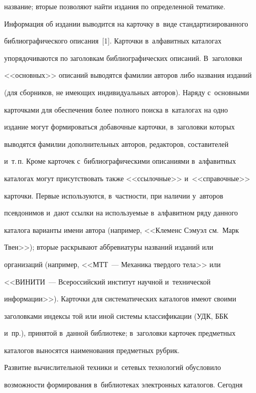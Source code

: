 название; вторые позволяют найти издания по определенной тематике. 


Информация об издании выводится на карточку в~виде стандартизированного 


библиографического описания~[1]. Карточки в~алфавитных каталогах 


упорядочиваются по заголовкам библиографических описаний. В~заголовки 


<<основных>> описаний выводятся фамилии авторов либо названия изданий 


(для сборников, не имеющих индивидуальных авторов). Наряду с~основными 


карточками для обеспечения более полного поиска в~каталогах на одно 


издание могут формироваться добавочные карточки, в~заголовки которых 


выводятся фамилии дополнительных авторов, редакторов, со\-ста\-ви\-те\-лей 


и~т.\,п. Кроме карточек с~библиографическими описаниями в~алфавитных 


каталогах могут присутствовать также <<ссылочные>> и~<<справочные>> 


карточки. Первые используются, в~част\-ности, при наличии у~авторов 


псевдонимов и~дают ссылки на используемые в~алфавитном ряду данного 


каталога варианты имени автора (например, <<Клеменс Сэмуэл см.\ Марк 


Твен>>); вторые раскрывают аббревиатуры названий изданий или 


организаций (например, <<МТТ~--- Механика твердого тела>> или 


<<ВИНИТИ~--- Всероссийский институт научной и~технической 


информации>>). Карточки для сис\-те\-ма\-ти\-че\-ских каталогов име\-ют своими 


заголовками индексы той или иной сис\-те\-мы классификации (УДК, ББК 


и~пр.), принятой в~данной биб\-лио\-те\-ке; в~заголовки карточек предметных 


каталогов выносятся наименования предметных руб\-рик.


  


  Развитие вычислительной техники и~сетевых технологий обусловило 


возможности формирования в~библиотеках электронных каталогов. Сегодня 


